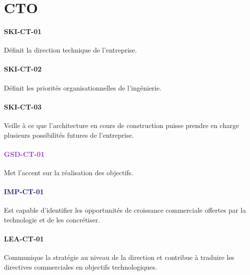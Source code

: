 \documentclass[a4paper, french, openany, 12pt]{book}
\newcommand\dex[1]{\textcolor{BrickRed}{\textbf{\uppercase{ski-{#1}}}}}
\newcommand\str[1]{\textcolor{DarkOrchid}{\textbf{\uppercase{gsd-{#1}}}}}
\newcommand\wis[1]{\textcolor{MidnightBlue}{\textbf{\uppercase{imp-{#1}}}}}
\newcommand\cha[1]{\textcolor{OliveGreen}{\textbf{\uppercase{lea-{#1}}}}}
\begin{document}
\chapter{CTO}

\begin{multicols}{2}

  \subsubsection*{\dex{ct-01}}

  Définit la direction technique de l'entreprise.

  \subsubsection*{\dex{ct-02}}

  Définit les priorités organisationnelles de l'ingénierie.

  \subsubsection*{\dex{ct-03}}

  Veille à ce que l'architecture en cours de construction puisse prendre en charge plusieurs possibilités futures de 
  l'entreprise.

  \subsubsection*{\str{ct-01}}

  Met l'accent sur la réalisation des objectifs.

  \subsubsection*{\wis{ct-01}}

  Est capable d'identifier les opportunités de croissance commerciale offertes par la technologie et de les concrétiser.

  \subsubsection*{\cha{ct-01}}

  Communique la stratégie au niveau de la direction et contribue à traduire les directives commerciales en objectifs 
  technologiques.

\end{multicols}

\backmatter

\tableofcontents
\end{document}
